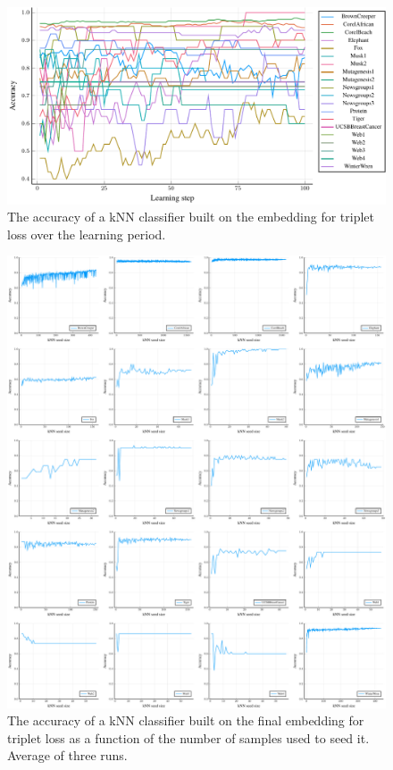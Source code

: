 \begin{figure}
  \centering
  \includegraphics[width=\textwidth]{images/triplet-toy/accuracy/triplet-toy-accuracy.pdf}
  \caption{The accuracy of a kNN classifier built on the embedding for triplet loss over the learning period.}\label{fig:triplet-toy-accuracy}
\end{figure}

\begin{figure}
  \centering
  \includegraphics[width=\textwidth]{images/triplet-toy/kNN/triplet-toy-kNN.pdf}
  \caption{The accuracy of a kNN classifier built on the final embedding for triplet loss as a function of the number of samples used to seed it. Average of three runs.}\label{fig:triplet-toy-kNN}
\end{figure}

